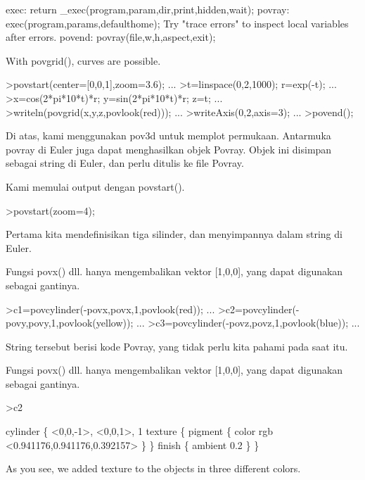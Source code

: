 \documentclass[a4paper,10pt]{article}
\begin{document}
\begin{eulernotebook}
\begin{euleroutput}
  exec:
      return _exec(program,param,dir,print,hidden,wait);
  povray:
      exec(program,params,defaulthome);
  Try "trace errors" to inspect local variables after errors.
  povend:
      povray(file,w,h,aspect,exit); 
\end{euleroutput}
\begin{eulercomment}
With povgrid(), curves are possible.
\end{eulercomment}
\begin{eulerprompt}
>povstart(center=[0,0,1],zoom=3.6); ...
>t=linspace(0,2,1000); r=exp(-t); ...
>x=cos(2*pi*10*t)*r; y=sin(2*pi*10*t)*r; z=t; ...
>writeln(povgrid(x,y,z,povlook(red))); ...
>writeAxis(0,2,axis=3); ...
>povend();
\end{eulerprompt}
\begin{eulercomment}
Di atas, kami menggunakan pov3d untuk memplot permukaan. Antarmuka
povray di Euler juga dapat menghasilkan objek Povray. Objek ini
disimpan sebagai string di Euler, dan perlu ditulis ke file Povray.

Kami memulai output dengan povstart().
\end{eulercomment}
\begin{eulerprompt}
>povstart(zoom=4);
\end{eulerprompt}
\begin{eulercomment}
Pertama kita mendefinisikan tiga silinder, dan menyimpannya dalam
string di Euler.

Fungsi povx() dll. hanya mengembalikan vektor [1,0,0], yang dapat
digunakan sebagai gantinya.
\end{eulercomment}
\begin{eulerprompt}
>c1=povcylinder(-povx,povx,1,povlook(red)); ...
>c2=povcylinder(-povy,povy,1,povlook(yellow)); ...
>c3=povcylinder(-povz,povz,1,povlook(blue)); ...
\end{eulerprompt}
\begin{eulercomment}
String tersebut berisi kode Povray, yang tidak perlu kita pahami pada
saat itu.

Fungsi povx() dll. hanya mengembalikan vektor [1,0,0], yang dapat
digunakan sebagai gantinya.
\end{eulercomment}
\begin{eulerprompt}
>c2
\end{eulerprompt}
\begin{euleroutput}
  cylinder \{ <0,0,-1>, <0,0,1>, 1
   texture \{ pigment \{ color rgb <0.941176,0.941176,0.392157> \}  \} 
   finish \{ ambient 0.2 \} 
   \}
\end{euleroutput}
\begin{eulercomment}
As you see, we added texture to the objects in three different colors.


\end{eulercomment}
\end{eulernotebook}
\end{document}
